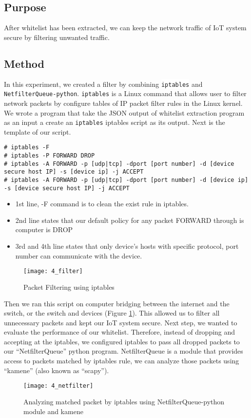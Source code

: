 \subsection{Purpose}
After whitelist has been extracted, we can keep the network traffic of IoT system secure by filtering unwanted traffic.  

\subsection{Method} 
 
In this experiment, we created a filter by combining 
\colorbox{white}{\lstinline[basicstyle=\ttfamily\color{black}]|iptables|} and 
\colorbox{white}{\lstinline[basicstyle=\ttfamily\color{black}]|NetfilterQueue-python|}. 
\colorbox{white}{\lstinline[basicstyle=\ttfamily\color{black}]|iptables|} is a Linux command that allows user to filter network packets by configure tables of IP packet filter rules in the Linux kernel. We wrote a program that take the JSON output of whitelist extraction program as an input a create an 
\colorbox{white}{\lstinline[basicstyle=\ttfamily\color{black}]|iptables|}
iptables script as its output. Next is the template of our script.
\\

\begin{lstlisting}[label=sh]
# iptables -F  
# iptables -P FORWARD DROP 
# iptables -A FORWARD -p [udp|tcp] -dport [port number] -d [device secure host IP] -s [device ip] -j ACCEPT 
# iptables -A FORWARD -p [udp|tcp] -dport [port number] -d [device ip] -s [device secure host IP] -j ACCEPT
\end{lstlisting}

\begin{itemize}
    \item 1st line, -F command is to clean the exist rule in iptables. 
    \item 2nd line states that our default policy for any packet FORWARD through is computer is DROP 
    \item 3rd and 4th line states that only device’s hosts with specific protocol, port number can communicate with the device.
\end{itemize}

\begin{figure}[h]
    \centering 
    \texttt{[image: 4\_filter]}
    \caption{Packet Filtering using iptables}
    \label{fig:s4_filter}
\end{figure} 

Then we ran this script on computer bridging between the internet and the switch, or the switch and devices (Figure \ref{fig:s4_filter}). This allowed us to filter all unnecessary packets and kept our IoT system secure. 
Next step, we wanted to evaluate the performance of our whitelist. Therefore, instead of dropping and accepting at the iptables, we configured iptables to pass all dropped packets to our “NetfilterQueue” python program. NetfilterQueue is a module that provides access to packets matched by iptables rule, we can analyze those packets using “kamene” (also known as “scapy”).

\begin{figure}[h]
    \centering 
    \texttt{[image: 4\_netfilter]} 
    \caption{Analyzing matched packet by iptables using NetfilterQueue-python module and kamene}
    \label{fig:s4_netfilter}
\end{figure} 